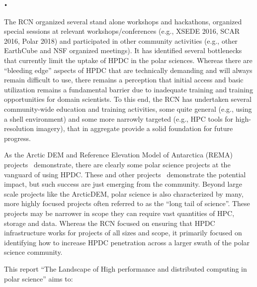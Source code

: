 \texttt{•}\documentclass[10pt,letterpaper,draft]{article}
\begin{document}
The RCN organized several stand alone workshops and hackathons, organized special sessions at relevant workshops/conferences (e.g., XSEDE 2016, SCAR 2016, Polar 2018) and participated in other community activities (e.g., other EarthCube and NSF organized meetings). It has identified several bottlenecks that currently limit the uptake of HPDC in the polar sciences. Whereas there are “bleeding edge” aspects of HPDC that are technically demanding and will always remain difficult to use, there remains a perception that initial access and basic utilization remains a fundamental barrier due to inadequate training and training opportunities for domain scientists. To this end, the RCN has undertaken several community-wide education and training activities, some quite general (e.g., using a shell environment) and some more narrowly targeted (e.g., HPC tools for high-resolution imagery), that in aggregate provide a solid foundation for future progress.

As the Arctic DEM and Reference Elevation Model of Antarctica (REMA) projects~\cite{Mimno2016-cw} demonstrate, there are clearly some polar science projects at the vanguard of using HPDC. These and other projects~\cite{Laws2007-dj} demonstrate the potential impact, but such success are just emerging from the community. Beyond large scale projects like the ArcticDEM, polar science is also characterized by many, more highly focused projects often referred to as the ``long tail of science''. These projects may be narrower in scope they can require vast quantities of HPC, storage and data. Whereas the RCN focused on ensuring that HPDC infrastructure works for projects of all sizes and scope, it primarily focused on identifying how to increase HPDC penetration across a larger swath of the polar science community. 

This report ``The Landscape of High performance and distributed computing in polar science'' aims to:
\end{document}

